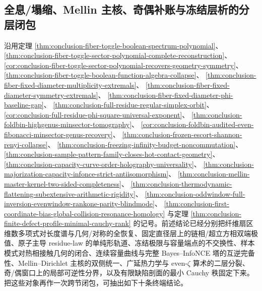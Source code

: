 \subsection{全息/塌缩、Mellin 主核、奇偶补账与冻结层析的分层闭包}\label{subsec:conclusion-holography-collapse-mellin-parity-freezing-layered-closure}
沿用定理
\ref{thm:conclusion-fiber-toggle-boolean-spectrum-polynomial}、
\ref{thm:conclusion-fiber-toggle-sector-polynomial-complete-reconstruction}、
\ref{cor:conclusion-fiber-toggle-sector-polynomial-recovers-geometry-symmetry}、
\ref{thm:conclusion-fiber-toggle-boolean-function-algebra-collapse}、
\ref{thm:conclusion-fiber-fixed-diameter-multiplicity-extremals}、
\ref{thm:conclusion-fiber-fixed-diameter-symmetry-extremals}、
\ref{thm:conclusion-fiber-fixed-diameter-phi-baseline-gap}、
\ref{thm:conclusion-full-residue-regular-simplex-orbit}、
\ref{cor:conclusion-full-residue-phi-square-universal-exponent}、
\ref{thm:conclusion-foldbin-highgenus-minsector-tomography}、
\ref{cor:conclusion-foldbin-audited-even-fibonacci-minsector-genus-recovery}、
\ref{thm:conclusion-frozen-escort-shannon-renyi-collapse}、
\ref{thm:conclusion-freezing-infinity-budget-noncommutation}、
\ref{thm:conclusion-sample-pattern-family-closes-hot-contact-geometry}、
\ref{thm:conclusion-capacity-curve-order-holography-universality}、
\ref{thm:conclusion-majorization-capacity-infonce-strict-antiisomorphism}、
\ref{thm:conclusion-mellin-master-kernel-two-sided-completeness}、
\ref{thm:conclusion-thermodynamic-flattening-subextensive-arithmetic-rigidity}、
\ref{thm:conclusion-oddwindow-full-inversion-evenwindow-rankone-parity-blindmode}、
\ref{thm:conclusion-first-coordinate-bias-global-collision-resonance-homology}
与定理
\ref{thm:conclusion-finite-defect-profile-minimal-cauchy-rank}
的记号。前述结论已经分别把纤维扇区维数多项式对长度谱与几何/对称的全恢复、固定直径层上的链相/超立方相双端极值、原子主导 residue-law 的单纯形轨道、冻结极限与容量端点的不交换性、样本模式对热相接触几何的闭合、连续容量曲线与完整 Bayes--InfoNCE 塔的互逆完备性、Mellin--Dirichlet 主核的双侧统一、广延热力学与 even-\(\zeta\) 算术的二层分裂、奇/偶窗口上的局部可逆性分界，以及有限缺陷剖面的最小 Cauchy 秩固定下来。把这些对象再作一次跨节闭包，可抽出如下十条终端结论。


